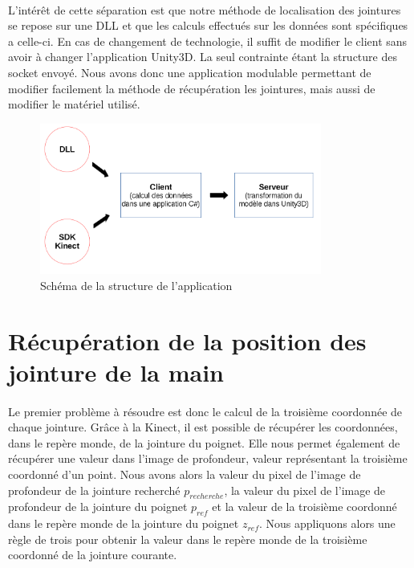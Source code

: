 \paragraph{}
L'intérêt de cette séparation est que notre méthode de localisation des jointures se repose sur une 
DLL et que les calculs effectués sur les données sont spécifiques a celle-ci. En cas de changement de 
technologie, il suffit de modifier le client sans avoir à changer l'application Unity3D. La seul contrainte
étant la structure des socket envoyé. Nous avons donc une application modulable permettant de modifier 
facilement la méthode de récupération les jointures, mais aussi de modifier le matériel utilisé.

\begin{figure}[H]
  \label{schema_application}
  \begin{center}
    \includegraphics[width=350px]{images/schemaAppli.png}
    \caption{Schéma de la structure de l'application}
  \end{center}
\end{figure}

\section{Récupération de la position des jointure de la main}
\paragraph{}
Le premier problème à résoudre est donc le calcul de la troisième coordonnée de chaque jointure. Grâce à la Kinect,
il est possible de récupérer les coordonnées, dans le repère monde, de la jointure du poignet. Elle nous permet
également de récupérer une valeur dans l'image de profondeur, valeur représentant la troisième coordonné d'un point.
Nous avons alors la valeur du pixel de l'image de profondeur de la jointure recherché $p_{recherche}$, la valeur
du pixel de l'image de profondeur de la jointure du poignet $p_{ref}$ et la valeur de la troisième coordonné dans 
le repère monde de la jointure du poignet $z_{ref}$. Nous appliquons alors une règle de trois pour obtenir 
la valeur dans le repère monde de la troisième coordonné de la jointure courante.

